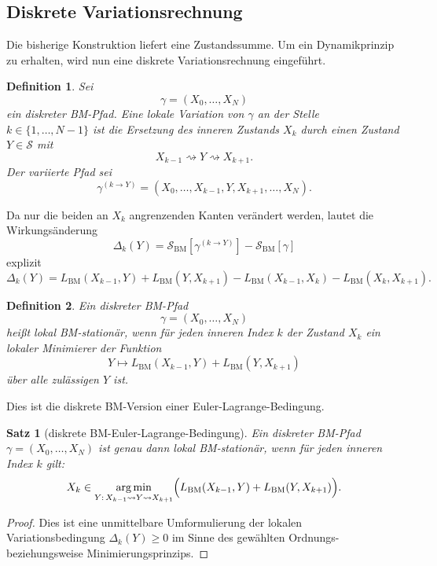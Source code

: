 \documentclass[11pt,a4paper]{article}
\newtheorem{satz}{Satz}
\newtheorem{definition}{Definition}
\theoremstyle{remark}
\begin{document}
	\subsection{Diskrete Variationsrechnung}
	
	Die bisherige Konstruktion liefert eine Zustandssumme. Um ein Dynamikprinzip zu erhalten, wird nun eine diskrete Variationsrechnung eingeführt.
	
	\begin{definition}
		Sei
		\[
		\gamma=(X_0,\dots,X_N)
		\]
		ein diskreter BM-Pfad. 
		Eine \emph{lokale Variation} von \(\gamma\) an der Stelle \(k\in\{1,\dots,N-1\}\) ist die Ersetzung des inneren Zustands \(X_k\) durch einen Zustand \(Y\in\mathcal S\) mit
		\[
		X_{k-1}\rightsquigarrow Y\rightsquigarrow X_{k+1}.
		\]
		Der variierte Pfad sei
		\[
		\gamma^{(k\to Y)}
		=
		(X_0,\dots,X_{k-1},Y,X_{k+1},\dots,X_N).
		\]
	\end{definition}
	
	Da nur die beiden an \(X_k\) angrenzenden Kanten verändert werden, lautet die Wirkungsänderung
	\[
	\Delta_k(Y)
	=
	\mathcal S_{\mathrm{BM}}[\gamma^{(k\to Y)}]
	-
	\mathcal S_{\mathrm{BM}}[\gamma]
	\]
	explizit
	\[
	\Delta_k(Y)
	=
	L_{\mathrm{BM}}(X_{k-1},Y)
	+
	L_{\mathrm{BM}}(Y,X_{k+1})
	-
	L_{\mathrm{BM}}(X_{k-1},X_k)
	-
	L_{\mathrm{BM}}(X_k,X_{k+1}).
	\]
	
	\begin{definition}
		Ein diskreter BM-Pfad
		\[
		\gamma=(X_0,\dots,X_N)
		\]
		heißt \emph{lokal BM-stationär}, wenn für jeden inneren Index \(k\) der Zustand \(X_k\) ein lokaler Minimierer der Funktion
		\[
		Y\mapsto
		L_{\mathrm{BM}}(X_{k-1},Y)+L_{\mathrm{BM}}(Y,X_{k+1})
		\]
		über alle zulässigen \(Y\) ist.
	\end{definition}
	
	Dies ist die diskrete BM-Version einer Euler-Lagrange-Bedingung.
	
	\begin{satz}[diskrete BM-Euler-Lagrange-Bedingung]
		Ein diskreter BM-Pfad \(\gamma=(X_0,\dots,X_N)\) ist genau dann lokal BM-stationär, wenn für jeden inneren Index \(k\) gilt:
		\[
		X_k \in \operatorname*{arg\,min}_{Y:\,X_{k-1}\rightsquigarrow Y\rightsquigarrow X_{k+1}}
		\Bigl(
		L_{\mathrm{BM}}(X_{k-1},Y)+L_{\mathrm{BM}}(Y,X_{k+1})
		\Bigr).
		\]
	\end{satz}
	
	\begin{proof}
		Dies ist eine unmittelbare Umformulierung der lokalen Variationsbedingung \(\Delta_k(Y)\ge 0\) im Sinne des gewählten Ordnungs- beziehungsweise Minimierungsprinzips.
	\end{proof}
	
\end{document}
